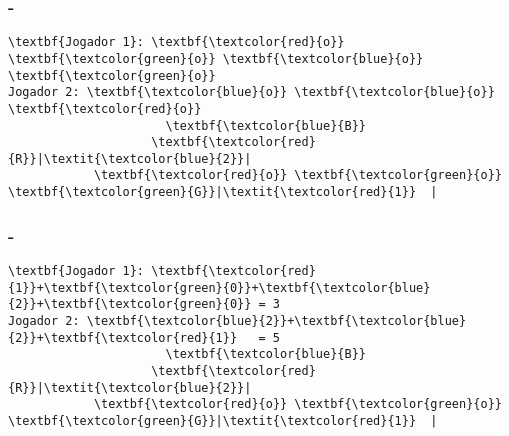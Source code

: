 \begin{frame}[fragile]
\frametitle{\secname - \subsecname}
\begin{Verbatim}[commandchars=\\\{\}]
\textbf{Jogador 1}: \textbf{\textcolor{red}{o}} \textbf{\textcolor{green}{o}} \textbf{\textcolor{blue}{o}} \textbf{\textcolor{green}{o}}
Jogador 2: \textbf{\textcolor{blue}{o}} \textbf{\textcolor{blue}{o}} \textbf{\textcolor{red}{o}}
                      \textbf{\textcolor{blue}{B}}
                    \textbf{\textcolor{red}{R}}|\textit{\textcolor{blue}{2}}|
            \textbf{\textcolor{red}{o}} \textbf{\textcolor{green}{o}}   \textbf{\textcolor{green}{G}}|\textit{\textcolor{red}{1}}  |
\end{Verbatim}
\end{frame}

\begin{frame}[fragile]
\frametitle{\secname - \subsecname}
\begin{Verbatim}[commandchars=\\\{\}]
\textbf{Jogador 1}: \textbf{\textcolor{red}{1}}+\textbf{\textcolor{green}{0}}+\textbf{\textcolor{blue}{2}}+\textbf{\textcolor{green}{0}} = 3
Jogador 2: \textbf{\textcolor{blue}{2}}+\textbf{\textcolor{blue}{2}}+\textbf{\textcolor{red}{1}}   = 5
                      \textbf{\textcolor{blue}{B}}
                    \textbf{\textcolor{red}{R}}|\textit{\textcolor{blue}{2}}|
            \textbf{\textcolor{red}{o}} \textbf{\textcolor{green}{o}}   \textbf{\textcolor{green}{G}}|\textit{\textcolor{red}{1}}  |
\end{Verbatim}
\end{frame}
